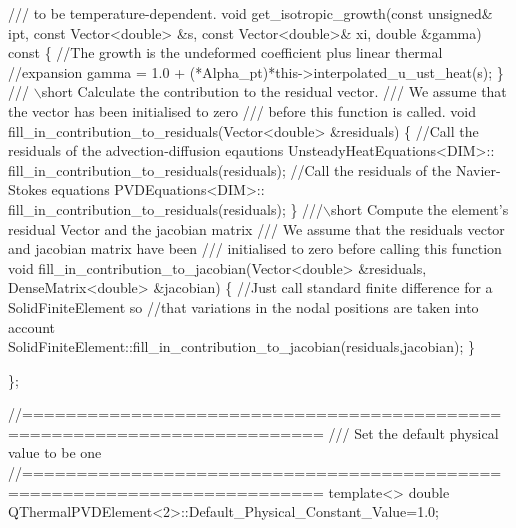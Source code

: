 \begin{DoxyCodeInclude}
\textcolor{comment}{ /// to be temperature-dependent.}
\textcolor{comment}{} \textcolor{keywordtype}{void} get\_isotropic\_growth(\textcolor{keyword}{const} \textcolor{keywordtype}{unsigned}& ipt, \textcolor{keyword}{const} Vector<double> &s, 
                           \textcolor{keyword}{const} Vector<double>& xi, \textcolor{keywordtype}{double} &gamma)\textcolor{keyword}{ const}
\textcolor{keyword}{ }\{
  \textcolor{comment}{//The growth is the undeformed coefficient plus linear thermal}
  \textcolor{comment}{//expansion}
  gamma = 1.0 + (*Alpha\_pt)*this->interpolated\_u\_ust\_heat(s);
 \}
 \textcolor{comment}{}
\textcolor{comment}{ /// \(\backslash\)short Calculate the contribution to the residual vector.}
\textcolor{comment}{ /// We assume that the vector has been initialised to zero}
\textcolor{comment}{ /// before this function is called.}
\textcolor{comment}{} \textcolor{keywordtype}{void} fill\_in\_contribution\_to\_residuals(Vector<double> &residuals)
  \{
   \textcolor{comment}{//Call the residuals of the advection-diffusion eqautions}
   UnsteadyHeatEquations<DIM>::
    fill\_in\_contribution\_to\_residuals(residuals);
   \textcolor{comment}{//Call the residuals of the Navier-Stokes equations}
   PVDEquations<DIM>::
    fill\_in\_contribution\_to\_residuals(residuals);
  \}
\textcolor{comment}{}
\textcolor{comment}{ ///\(\backslash\)short Compute the element's residual Vector and the jacobian matrix}
\textcolor{comment}{ /// We assume that the residuals vector and jacobian matrix have been}
\textcolor{comment}{ /// initialised to zero before calling this function}
\textcolor{comment}{} \textcolor{keywordtype}{void} fill\_in\_contribution\_to\_jacobian(Vector<double> &residuals,
                                       DenseMatrix<double> &jacobian)
  \{
   \textcolor{comment}{//Just call standard finite difference for a SolidFiniteElement so }
   \textcolor{comment}{//that variations in the nodal positions are taken into account}
   SolidFiniteElement::fill\_in\_contribution\_to\_jacobian(residuals,jacobian);
  \}

\};

\textcolor{comment}{//=========================================================================}\textcolor{comment}{}
\textcolor{comment}{/// Set the default physical value to be one}
\textcolor{comment}{}\textcolor{comment}{//=========================================================================}
\textcolor{keyword}{template}<>
\textcolor{keywordtype}{double} QThermalPVDElement<2>::Default\_Physical\_Constant\_Value=1.0;


\end{DoxyCodeInclude}
